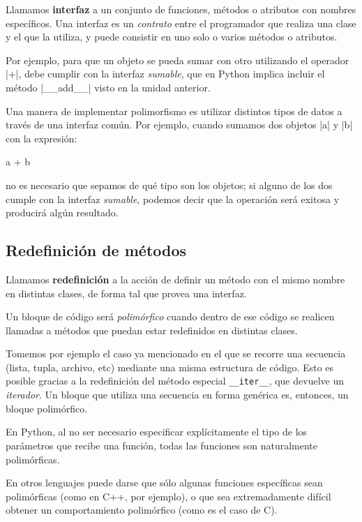 Llamamos {\bf interfaz} a un conjunto de funciones, métodos o atributos con
nombres específicos.  Una interfaz es un {\it contrato} entre el
programador que realiza una clase y el que la utiliza, y puede consistir en
uno solo o varios métodos o atributos.

Por ejemplo, para que un objeto se pueda sumar con otro utilizando el
operador |+|, debe cumplir con la interfaz {\it sumable}, que en Python
implica incluir el método |__add__| visto en la unidad anterior.

Una manera de implementar polimorfismo es utilizar distintos tipos de
datos a través de una interfaz común. Por ejemplo, cuando sumamos dos
objetos |a| y |b| con la expresión:

\begin{codigo-python-sn}
a + b
\end{codigo-python-sn}

\noindent no es necesario que sepamos de qué tipo son los objetos; si
alguno de los dos cumple con la interfaz {\it sumable}, podemos decir
que la operación será exitosa y producirá algún resultado.

\subsection{Redefinición de métodos}

Llamamos {\bf redefinición} a la acción de definir un método con el mismo
nombre en distintas clases, de forma tal que provea una interfaz.

Un bloque de código será {\it polimórfico} cuando dentro de ese código se
realicen llamadas a métodos que puedan estar redefinidos en distintas
clases.

Tomemos por ejemplo el caso ya mencionado en el que se recorre una
secuencia (lista, tupla, archivo, etc) mediante una misma estructura de
código.  Esto es posible gracias a la redefinición del método especial
\lstinline!__iter__!, que devuelve un {\it iterador}.  Un bloque que
utiliza una secuencia en forma genérica es, entonces, un bloque
polimórfico.

\begin{sabias_que}
En Python, al no ser necesario especificar explícitamente el tipo de los
parámetros que recibe una función, todas las funciones son naturalmente
polimórficas.

En otros lenguajes puede darse que sólo algunas funciones específicas sean
polimórficas (como en C++, por ejemplo), o que sea extremadamente difícil
obtener un comportamiento polimórfico (como es el caso de C).
\end{sabias_que}

